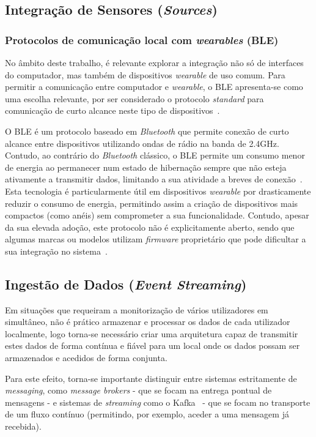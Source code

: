 \subsection{Integração de Sensores (\textit{Sources})}

\subsubsection{Protocolos de comunicação local com \textit{wearables} (\ac{BLE})}

No âmbito deste trabalho, é relevante explorar a integração não só de interfaces do computador, mas também de dispositivos \textit{wearable} de uso comum.
Para permitir a comunicação entre computador e \textit{wearable}, o \ac{BLE} apresenta-se como uma escolha relevante, por ser considerado o protocolo \textit{standard} para comunicação de curto alcance neste tipo de dispositivos~\cite{KurtPeker2022}.

O \ac{BLE} é um protocolo baseado em \textit{Bluetooth} que permite conexão de curto alcance entre dispositivos utilizando ondas de rádio na banda de 2.4GHz. Contudo, ao contrário do \textit{Bluetooth} clássico, o \ac{BLE} permite um consumo menor de energia ao permanecer num estado de hibernação sempre que não esteja ativamente a transmitir dados, limitando a sua atividade a breves de conexão~\cite{Proctor2023}.
Esta tecnologia é particularmente útil em dispositivos \textit{wearable} por drasticamente reduzir o consumo de energia, permitindo assim a criação de dispositivos mais compactos (como anéis) sem comprometer a sua funcionalidade.
Contudo, apesar da sua elevada adoção, este protocolo não é explicitamente aberto, sendo que algumas marcas ou modelos utilizam \textit{firmware} proprietário que pode dificultar a sua integração no sistema~\cite{blexiaomi}.

\subsection{Ingestão de Dados (\textit{Event Streaming})}

Em situações que requeiram a monitorização de vários utilizadores em simultâneo, não é prático armazenar e processar os dados de cada utilizador localmente, logo torna-se necessário criar uma arquitetura capaz de transmitir estes dados de forma contínua e fiável para um local onde os dados possam ser armazenados e acedidos de forma conjunta.

Para este efeito, torna-se importante distinguir entre sistemas estritamente de \textit{messaging}, como \textit{message brokers} - que se focam na entrega pontual de mensagens - e sistemas de \textit{streaming} como o Kafka~\cite{Kafka_main} - que se focam no transporte de um fluxo contínuo (permitindo, por exemplo, aceder a uma mensagem já recebida).
 
